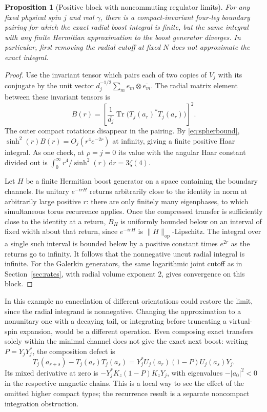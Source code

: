 \documentclass[11pt]{article}
\newtheorem{proposition}[theorem]{Proposition}
\theoremstyle{remark}
\newcommand{\Tr}{\operatorname{Tr}}
\newcommand{\dd}{\mathrm d}
\begin{document}
\begin{proposition}[Positive block with noncommuting regulator limits]\label{pr:recurrence}
For any fixed physical spin \(j\) and real \(\gamma\), there is a compact-invariant four-leg boundary pairing for which the exact radial boost integral is finite, but the same integral with any finite Hermitian approximation to the boost generator diverges. In particular, first removing the radial cutoff at fixed \(N\) does not approximate the exact integral.
\end{proposition}
\begin{proof}
Use the invariant tensor which pairs each of two copies of \(V_j\) with its conjugate by the unit vector \(d_j^{-1/2}\sum_m e_m\otimes\overline{e_m}\). The radial matrix element between these invariant tensors is
\[
B(r)=\left[\frac{1}{d_j}\Tr\big(T_j(a_r)^*T_j(a_r)\big)\right]^2.
\]
The outer compact rotations disappear in the pairing. By \eqref{eq:spherbound}, \(\sinh^2(r)B(r)=O_j(r^4e^{-2r})\) at infinity, giving a finite positive Haar integral. As one check, at \(\rho=j=0\) its value with the angular Haar constant divided out is
\(\int_0^\infty r^4/\sinh^2(r)\,\dd r=3\zeta(4)\).

Let \(H\) be a finite Hermitian boost generator on a space containing the boundary channels. Its unitary \(e^{-irH}\) returns arbitrarily close to the identity in norm at arbitrarily large positive \(r\): there are only finitely many eigenphases, to which simultaneous torus recurrence applies. Once the compressed transfer is sufficiently close to the identity at a return, \(B_H\) is uniformly bounded below on an interval of fixed width about that return, since \(e^{-irH}\) is \(\|H\|_{\mathrm{op}}\)-Lipschitz. The integral over a single such interval is bounded below by a positive constant times \(e^{2r}\) as the returns go to infinity. It follows that the nonnegative uncut radial integral is infinite. For the Galerkin generators, the same logarithmic joint cutoff as in Section~\ref{sec:rates}, with radial volume exponent 2, gives convergence on this block.
\end{proof}

In this example no cancellation of different orientations could restore the limit, since the radial integrand is nonnegative. Changing the approximation to a nonunitary one with a decaying tail, or integrating before truncating a virtual-spin expansion, would be a different operation. Even composing exact transfers solely within the minimal channel does not give the exact next boost: writing \(P=Y_jY_j^*\), the composition defect is
\[
T_j(a_{r+s})-T_j(a_r)T_j(a_s)=Y_j^*U_j(a_r)(1-P)U_j(a_s)Y_j .
\]
Its mixed derivative at zero is \(-Y_j^*K_z(1-P)K_zY_j\), with eigenvalues \(-|a_0|^2<0\) in the respective magnetic chains. This is a local way to see the effect of the omitted higher compact types; the recurrence result is a separate noncompact integration obstruction.
\end{document}
